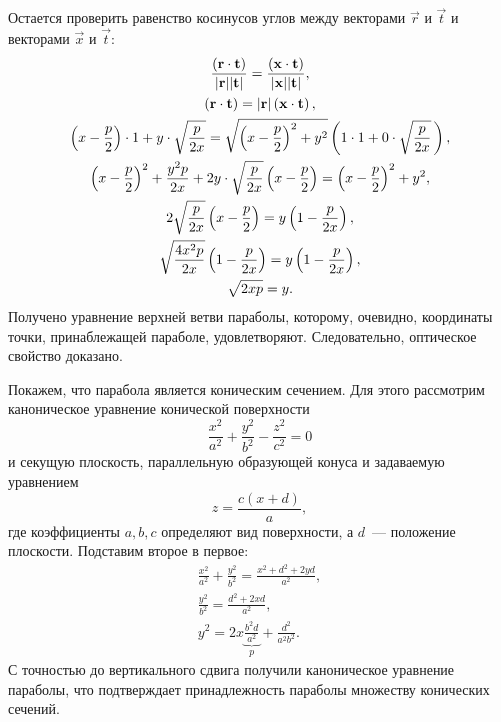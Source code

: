 Остается проверить равенство косинусов углов между векторами $\vec r$ и $\vec t$ и векторами $\vec x$ и $\vec t$:
\begin{gather*}
	\frac{\left(\mathbf{r} \cdot \mathbf{t}\right)}{|\mathbf{r}| | \mathbf{t}|} = \frac{\left(\mathbf{x} \cdot \mathbf{t}\right)}{|\mathbf{x}| |\mathbf{t}|},\\
	\left(\mathbf{r} \cdot \mathbf{t}\right) = |\mathbf{r}| \left(\mathbf{x} \cdot \mathbf{t}\right),\\
	\left(x - \frac{p}{2}\right)\cdot 1 + y \cdot \sqrt{\frac{p}{2x}}  = \sqrt{\left( x - \frac{p}{2} \right)^2 + y^2 } \left(1 \cdot 1 + 0 \cdot \sqrt{\frac{p}{2x}} \,\right),\\
	\left(x - \frac{p}{2}\right)^2 + \frac{y^2 p}{2x} + 2 y \cdot \sqrt{\frac{p}{2x}} \left(x - \frac{p}{2}\right) = \left(x - \frac{p}{2}\right)^2 + y^2,\\
	2  \sqrt{\frac{p}{2x}} \left(x - \frac{p}{2}\right) =  y \left( 1 - \frac{p}{2x} \right),\\
	\sqrt{\frac{4x^2p}{2x}} \left(1 - \frac{p}{2x}\right) =  y \left( 1 - \frac{p}{2x} \right),\\
	\sqrt{2xp}  =  y.
\end{gather*}
Получено уравнение верхней ветви параболы, которому, очевидно, координаты точки, принаблежащей параболе, удовлетворяют. Следовательно, оптическое свойство доказано.

Покажем, что парабола является коническим сечением. Для этого рассмотрим каноническое уравнение конической поверхности
\begin{equation*}
	\frac{x^2}{a^2} + \frac{y^2}{b^2} - \frac{z^2}{c^2} = 0
\end{equation*}
и секущую плоскость, параллельную образующей конуса и задаваемую уравнением
\begin{equation*}
	z = \frac{c(x + d)}{a},
\end{equation*}
где коэффициенты $a, b, c$ определяют вид поверхности, а $d$~--- положение плоскости. Подставим второе в первое:
\begin{gather*}
	\frac{x^2}{a^2} + \frac{y^2}{b^2} = \frac{x^2 + d^2 + 2yd}{a^2},\\
	\frac{y^2}{b^2} = \frac{d^2 + 2xd}{a^2},\\
	y^2 = 2 x \underbrace{\frac{b^2d}{a^2}}_p + \frac{d^2}{a^2 b^2}.
\end{gather*}
С точностью до вертикального сдвига получили каноническое уравнение параболы, что подтверждает принадлежность параболы множеству конических сечений.

